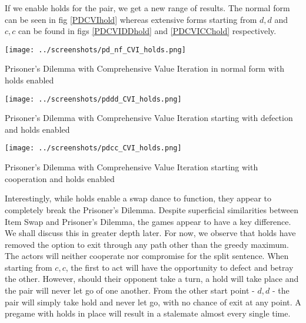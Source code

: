 If we enable holds for the pair, we get a new range of results. The normal form can be seen in fig \ref{PDCVIhold} whereas extensive forms starting from $d,d$ and $c,c$ can be found in figs \ref{PDCVIDDhold} and \ref{PDCVICChold} respectively.

\begin{fig}[H]
  \begin{minipage}[b]{1.0\linewidth}
    \centering
    \centerline{\texttt{[image: ../screenshots/pd\_nf\_CVI\_holds.png]}}
    \caption{Prisoner's Dilemma with Comprehensive Value Iteration in normal form with holds enabled}\medskip\label{PDCVIhold}
  \end{minipage}
\end{fig}

\begin{fig}[H]
  \begin{minipage}[b]{1.0\linewidth}
    \centering
    \centerline{\texttt{[image: ../screenshots/pddd\_CVI\_holds.png]}}
    \caption{Prisoner's Dilemma with Comprehensive Value Iteration starting with defection and holds enabled}\medskip\label{PDCVIDDhold}
  \end{minipage}
\end{fig}

\begin{fig}[H]
  \begin{minipage}[b]{1.0\linewidth}
    \centering
    \centerline{\texttt{[image: ../screenshots/pdcc\_CVI\_holds.png]}}
    \caption{Prisoner's Dilemma with Comprehensive Value Iteration starting with cooperation and holds enabled}\medskip\label{PDCVICChold}
  \end{minipage}
\end{fig}

Interestingly, while holds enable a swap dance to function, they appear to completely break the Prisoner's Dilemma. Despite superficial similarities between Item Swap and Prisoner's Dilemma, the games appear to have a key difference. We shall discuss this in greater depth later. For now, we observe that holds have removed the option to exit through any path other than the greedy maximum. The actors will neither cooperate nor compromise for the split sentence. When starting from $c,c$, the first to act will have the opportunity to defect and betray the other. However, should their opponent take a turn, a hold will take place and the pair will never let go of one another. From the other start point - $d,d$ - the pair will simply take hold and never let go, with no chance of exit at any point. A pregame with holds in place will result in a stalemate almost every single time.

